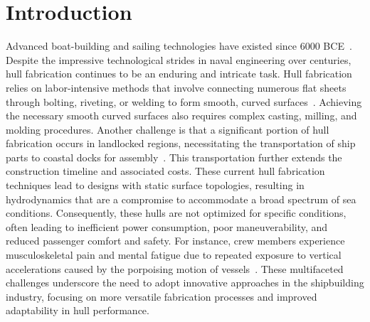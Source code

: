 \section{Introduction}\label{05-sec-origami-hull-intro}
Advanced boat-building and sailing technologies have existed since 6000 BCE~\cite{carter_boat_2006}. Despite the impressive technological strides in naval engineering over centuries, hull fabrication continues to be an enduring and intricate task. Hull fabrication relies on labor-intensive methods that involve connecting numerous flat sheets through bolting, riveting, or welding to form smooth, curved surfaces~\cite{paoli_fabrication_2012}. Achieving the necessary smooth curved surfaces also requires complex casting, milling, and molding procedures. Another challenge is that a significant portion of hull fabrication occurs in landlocked regions, necessitating the transportation of ship parts to coastal docks for assembly~\cite{bruce_ship_2021}. This transportation further extends the construction timeline and associated costs. These current hull fabrication techniques lead to designs with static surface topologies, resulting in hydrodynamics that are a compromise to accommodate a broad spectrum of sea conditions. Consequently, these hulls are not optimized for specific conditions, often leading to inefficient power consumption, poor maneuverability, and reduced passenger comfort and safety. For instance, crew members experience musculoskeletal pain and mental fatigue due to repeated exposure to vertical accelerations caused by the porpoising motion of vessels~\cite{bjorn_crew_2017}. These multifaceted challenges underscore the need to adopt innovative approaches in the shipbuilding industry, focusing on more versatile fabrication processes and improved adaptability in hull performance.

